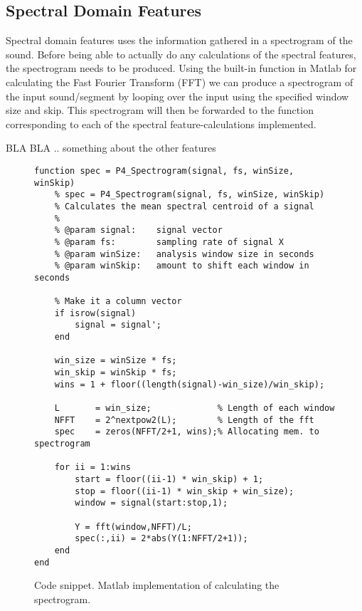 \subsection{Spectral Domain Features}
Spectral domain features uses the information gathered in a spectrogram of the sound. Before being able to actually do any calculations of the spectral features, the spectrogram needs to be produced. Using the built-in function in Matlab for calculating the Fast Fourier Transform (FFT) we can produce a spectrogram of the input sound/segment by looping over the input using the specified window size and skip. This spectrogram will then be forwarded to the function corresponding to each of the spectral feature-calculations implemented.

BLA BLA .. something about the other features

\begin{figure}
\begin{lstlisting}
function spec = P4_Spectrogram(signal, fs, winSize, winSkip)
    % spec = P4_Spectrogram(signal, fs, winSize, winSkip)
    % Calculates the mean spectral centroid of a signal
    %
    % @param signal:    signal vector
    % @param fs:        sampling rate of signal X
    % @param winSize:   analysis window size in seconds
    % @param winSkip:   amount to shift each window in seconds
    
    % Make it a column vector
    if isrow(signal)
        signal = signal';
    end
    
    win_size = winSize * fs;
    win_skip = winSkip * fs;
    wins = 1 + floor((length(signal)-win_size)/win_skip);
    
    L       = win_size;             % Length of each window
    NFFT    = 2^nextpow2(L);        % Length of the fft
    spec    = zeros(NFFT/2+1, wins);% Allocating mem. to spectrogram
    
    for ii = 1:wins
        start = floor((ii-1) * win_skip) + 1;
        stop = floor((ii-1) * win_skip + win_size);
        window = signal(start:stop,1);
        
        Y = fft(window,NFFT)/L;
        spec(:,ii) = 2*abs(Y(1:NFFT/2+1));
    end
end
\end{lstlisting}
\caption{Code snippet. Matlab implementation of calculating the spectrogram.}
\label{snippet-spectrogram}
\end{figure}